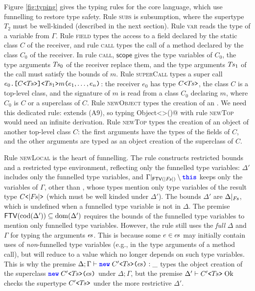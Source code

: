 Figure \ref{fig:typing} gives the typing rules for the core language, which use funnelling to restore type safety.
Rule \textsc{subs} is subsumption, where the supertype $T_2$ must be well-kinded (described in the next section). Rule \textsc{var} reads the type of a variable from $\Gamma$.
Rule \textsc{field} types the access to a field declared by the static class $C$ of the receiver, and rule \textsc{call} types the call of a method declared by the class $C_0$ of the receiver.
In rule \textsc{call}, $\mathsf{scope}$ gives the type variables of $C_0$, the type arguments $T\mkern-2mu s_0$ of the receiver replace them, and the type arguments $T\mkern-2mu s_1$ of the call must satisfy the bounds of $m$.
Rule \textsc{superCall} types a super call $e_0\text{\ttfamily .}\text{\ttfamily [}C\text{\ttfamily <}T\mkern-2mu s\text{\ttfamily >}\text{\ttfamily ]}\text{\ttfamily <}T\mkern-2mu s_1\text{\ttfamily >} m\text{\ttfamily (} e_1,\ldots,e_n\text{\ttfamily )}$: the receiver $e_0$ has type $C\text{\ttfamily <}T\mkern-2mu s\text{\ttfamily >}$, the class $C$ is a top-level class, and the signature of $m$ is read from a class $C_0$ declaring $m$, where $C_0$ is $C$ or a superclass of $C$.
Rule \textsc{newObject} types the creation of an \Q@Object@.
We need this dedicated rule: \Q@Object@ extends \Q@Object@ (A9), so typing \Q@new Object<>()@ with rule \textsc{newTop} would need an infinite derivation.
Rule \textsc{newTop} types the creation of an object of another top-level class $C$: the first arguments have the types of the fields of $C$, and the other arguments are typed as an object creation of the superclass of $C$.

Rule \textsc{newLocal} is the heart of funnelling.
The rule constructs restricted bounds and a restricted type environment, reflecting only the funnelled type variables:
$\Delta'$ includes only the funnelled type variables, and $\Gamma|_{\mathsf{FTV}(|F\mkern-2mu s|)}\setminus\text{\ttfamily\bfseries\color{blue}this}$ keeps only the variables of $\Gamma$, other than \Q@this@, whose types mention only type variables of the result type $C\text{\ttfamily <}|F\mkern-2mu s|\text{\ttfamily >}$ (which must be well kinded under $\Delta'$).
The bounds $\Delta'$ are $\Delta|_{F\mkern-2mu s}$, which is undefined when a funnelled type variable is not in $\Delta$.
The premise $\mathsf{FTV}(\mathrm{cod}(\Delta'))\subseteq\mathrm{dom}(\Delta')$ requires the bounds of the funnelled type variables to mention only funnelled type variables.
However, the rule still uses the \emph{full} $\Delta$ and $\Gamma$ for typing the arguments $e\mkern-2mu s$. This is because some $e\in e\mkern-2mu s$ may initially contain uses of \emph{non}-funnelled type variables (e.g., in the type arguments of a method call), but will reduce to a value which no longer depends on such type variables.
This is why the premise $\Delta;\Gamma\vdash \text{\ttfamily\bfseries\color{blue}new}\mskip5muC'\text{\ttfamily <}T\mkern-2mu s\text{\ttfamily >}\text{\ttfamily (}e\mkern-2mu s\text{\ttfamily )} : \_$ types the object creation of the superclass $\text{\ttfamily\bfseries\color{blue}new}\mskip5muC'\text{\ttfamily <}T\mkern-2mu s\text{\ttfamily >}\text{\ttfamily (}e\mkern-2mu s\text{\ttfamily )}$ under $\Delta;\Gamma$, but the premise $\Delta' \vdash C'\text{\ttfamily <}T\mkern-2mu s\text{\ttfamily >}\mskip5mu\mathrm{Ok}$ checks the supertype $C'\text{\ttfamily <}T\mkern-2mu s\text{\ttfamily >}$ under the more restrictive $\Delta'$.

